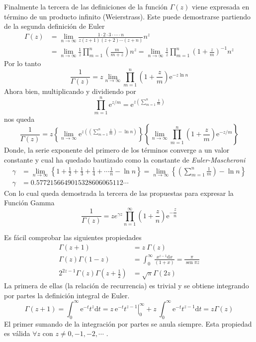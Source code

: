 \documentclass[spanish,notitlepage,letterpaper,12pt]{article}
\begin{document}
Finalmente la tercera de las definiciones de la funci\'{o}n $\Gamma\left(
z\right)  $ viene expresada en t\'{e}rmino de un producto infinito
(Weierstrass). Este puede demostrarse partiendo de la segunda definici\'{o}n
de Euler
\begin{align*}
\Gamma\left(  z\right)   & =\lim_{n\rightarrow\infty}\frac{1\cdot2\cdot
3\cdot\cdots\cdot n}{z\left(  z+1\right)  \left(  z+2\right)  \cdots\left(
z+n\right)  }n^{z}\\
& =\lim_{n\rightarrow\infty}\frac1z\prod_{m=1}^{n}\left(  \frac m{m+z}\right)
n^{z}=\lim_{n\rightarrow\infty}\frac1z\prod_{m=1}^{n}\left(  1+\frac
zm\right)  ^{-1}n^{z}%
\end{align*}
Por lo tanto
\[
\frac1{\Gamma\left(  z\right)  }=z\lim_{n\rightarrow\infty}\prod_{m=1}%
^{n}\left(  1+\frac zm\right)  \mathrm{e}^{-z\ln n}
\]
Ahora bien, multiplicando y dividiendo por
\[
\prod_{m=1}^{n}\mathrm{e}^{z/m}=\mathrm{e}^{z\left(  \sum_{m=1}^{n}%
\frac1m\right)  }
\]
nos queda
\[
\frac1{\Gamma\left(  z\right)  }=z\left\{  \lim_{n\rightarrow\infty}%
\mathrm{e}^{z\left(  \left(  \sum_{m=1}^{n}\frac1m\right)  -\ln n\right)
}\right\}  \left\{  \lim_{n\rightarrow\infty}\prod_{m=1}^{n}\left(  1+\frac
zm\right)  \mathrm{e}^{-z/m}\right\}
\]
Donde, la serie exponente del primero de los t\'{e}rminos converge a un valor
constante y cual ha quedado bautizado como la constante de
\textit{Euler-Mascheroni}
\begin{align*}
\gamma & =\lim_{n\rightarrow\infty}\left\{  1+\frac12+\frac13+\frac
14+\cdots\frac1n-\ln n\right\}  =\lim_{n\rightarrow\infty}\left\{  \left(
\sum_{m=1}^{n}\frac1m\right)  -\ln n\right\} \\
\gamma & =0.5772156649015328606065112\cdots
\end{align*}
Con lo cual queda demostrada la tercera de las propuestas para expresar la
Funci\'{o}n Gamma
\[
\frac1{\Gamma\left(  z\right)  }=ze^{\gamma z}\prod_{n=1}^{\infty}\left(
1+\frac zn\right)  \mathrm{e}^{-\dfrac zn}
\]

Es f\'{a}cil comprobar las siguientes propiedades
\begin{align*}
\Gamma\left(  z+1\right)   & =z\ \Gamma\left(  z\right) \\
\Gamma\left(  z\right)  \Gamma\left(  1-z\right)   & =\int_{0}^{\infty}%
\frac{x^{z-1}\mathrm{d}x}{\left(  1+x\right)  }=\frac\pi{\operatorname*{sen}%
\pi z}\\
2^{2z-1}\Gamma\left(  z\right)  \Gamma\left(  z+\frac12\right)   & =\sqrt{\pi
}\Gamma\left(  2z\right)
\end{align*}
La primera de ellas (la relaci\'{o}n de recurrencia) es trivial y se obtiene
integrando por partes la definici\'{o}n integral de Euler.
\[
\Gamma\left(  z+1\right)  =\int_{0}^{\infty}\mathrm{e}^{-t}t^{z}%
\mathrm{d}t=\left.  z\ \mathrm{e}^{-t}t^{z-1}\right|  _{0}^{\infty}%
+z\ \int_{0}^{\infty}\mathrm{e}^{-t}t^{z-1}\mathrm{d}t=z\Gamma\left(
z\right)
\]
El primer sumando de la integraci\'{o}n por partes se anula siempre. Esta
propiedad es v\'{a}lida $\forall z$ con $z\neq0,-1,-2,\cdots$ .
\end{document}
